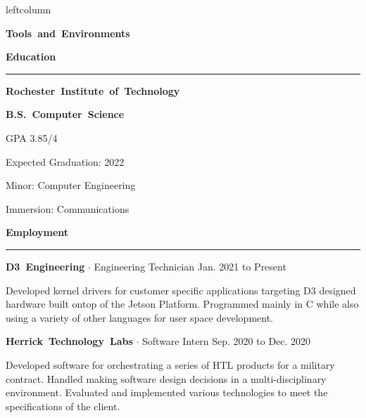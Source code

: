 \documentclass{article}
\newcommand{\rSection}[1] {
  \textcolor{header-blue} {
    \textbf{{\fontsize{0.5cm}{0.45cm}\selectfont \hbox{#1}}} \\
    \rule{0.30\textwidth}{0.1cm}
  }
}
\newcommand{\rSubSection}[1] {
  \textbf{{\fontsize{0.4cm}{0.45cm}\selectfont \hbox{#1}}}
}
\newcommand{\rSubSubSection}[1] {
  \textbf{{\fontsize{0.35cm}{0.45cm}\selectfont \hbox{#1}}}
}
\newcommand\level[2]{%
  \tikz{%
    \ifx#20
    \else
      \foreach \i in {1,...,#2} {
        \filldraw[black!20] (\i ex,0) circle (0.4ex);
      };
    \fi
    \ifx#10
    \else
      \foreach \i in {1,...,#1} {
        \filldraw[black] (\i ex,0) circle (0.4ex);
      };
    \fi
  }
}
\begin{document}
\begin{dynamiccontents*}{leftcolumn}
  \rSubSection{Tools and Environments} \par \bigskip


\end{dynamiccontents*}

\rSection{Education} \par \bigskip
\rSubSubSection{Rochester Institute of Technology} \par
\rSubSubSection{B.S. Computer Science} \par
GPA 3.85/4 \par
Expected Graduation: 2022 \par
Minor: Computer Engineering \par
Immersion: Communications \par


\rSection{Employment} \par

\rSubSubSection{D3 Engineering} $ \cdot $ Engineering Technician \hfill Jan. 2021 to Present \par
Developed kernel drivers for customer specific applications targeting D3 designed hardware built
ontop of the Jetson Platform. Programmed mainly in C while also using a variety of other languages
for user space development. \par \bigskip

\rSubSubSection{Herrick Technology Labs} $ \cdot $ Software Intern \hfill Sep. 2020 to Dec. 2020 \par
Developed software for orchestrating a series of HTL products for a military contract. Handled making
software design decisions in a multi-disciplinary environment. Evaluated and implemented various technologies
to meet the specifications of the client. \par \bigskip
\end{document}
